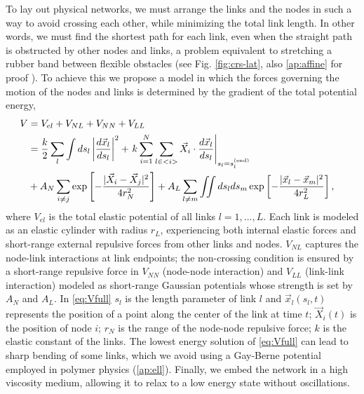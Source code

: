 \documentclass[endfloats,nofootinbib,preprint,floatfix,titlepage,superscriptaddress]{revtex4} %
\begin{document}
To lay out physical networks, we must arrange the links and the nodes in such a way to avoid crossing each other, while minimizing the total link length. 
In other words, we must find the shortest path for each link, even when the straight path is obstructed by other nodes and links, a problem equivalent to stretching a rubber band between flexible obstacles (see Fig. \ref{fig:crs-lat}, also \ref{ap:affine} for proof \cite{novikov1984}). 
To achieve this we propose a model in which the forces governing the motion of the nodes and links is determined by the gradient of the total potential energy,  
\begin{align}
    V &= V_{el} + V_{NL} +V_{NN} + V_{LL} \cr 
    &= {k\over 2}\sum_l\int ds_l \left|{d\vec{x}_l\over ds_l} \right|^2 + 
    \left. k\sum_{i=1}^N  \sum_{l\in <i>}  \vec{X}_i \cdot{d\vec{x}_l%
    \over ds_l}\right|_{s_l = s_l^{(\mathrm{end})}}
    \cr
    &+ A_N\sum_{i\ne j}  \exp\left[- {|\vec{X}_i-\vec{X}_j|^2 \over 4r_N^2}\right]+A_L\sum_{l\ne m} \iint ds_lds_m 
    \exp\left[- {|\vec{x}_l-\vec{x}_m|^2 \over 4 r_L^2}\right] ,
 \label{eq:Vfull}
\end{align}
where $V_{el}$ is the total elastic potential of all links $l=1,...,L$. 
Each link is modeled as an elastic cylinder with radius $r_L$, experiencing both internal elastic forces and short-range external repulsive forces from other links and nodes. $V_{NL}$ captures the node-link interactions at link endpoints;
the non-crossing condition is ensured by a short-range repulsive force in
$V_{NN}$  (node-node interaction)  and  $V_{LL}$ (link-link interaction) modeled as short-range Gaussian potentials whose strength is set by $A_N$ and $A_L$. 
In \eqref{eq:Vfull} $s_l$ is the length parameter of link $l$ and  $\vec{x}_l(s_l,t)$ represents the position of a point along the center of the link at time $t$;
$\vec{X}_i(t)$ is the position of node $i$; $r_N$ is the range of the node-node repulsive force; $k$ is the elastic constant of the links.
The lowest energy solution of \eqref{eq:Vfull} can lead to sharp bending of some links, which we avoid using a Gay-Berne potential \cite{gay1981modification} %
employed in polymer physics %
\citep{everaers2003interaction,babadi2006coarse} (\ref{ap:ell}). 
Finally, we embed the network in a high viscosity medium, allowing it to relax to a low energy state without oscillations.
\end{document}
